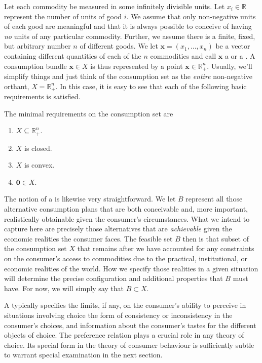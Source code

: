 \documentclass[b5paper]{memoir}
\begin{document}
Let each commodity be measured in some infinitely divisible units. Let $x_i \in \mathbb{R}$
represent the number of units of good $i$. We assume that only non-negative units of each
good are meaningful and that it is always possible to conceive of having \emph{no} units
of any particular commodity. Further, we assume there is a finite, fixed, but arbitrary
number $n$ of different goods. We let $\mathbf x = (x_1, \ldots, x_n )$ be a vector
containing different quantities of each of the $n$ commodities and call $\mathbf x$ a
 or a . A consumption bundle
$\mathbf x \in X$ is thus represented by a point $\mathbf x \in \mathbb{R}^n_+$. Usually,
we’ll simplify things and just think of the consumption set as the \emph{entire}
non-negative orthant, $X = \mathbb{R}^n_+$. In this case, it is easy to see that each 
of the following basic requirements is satisfied.

\begin{assump}
The minimal requirements on the consumption set are
\begin{enumerate} 
\item $X \subseteq \mathbb{R}^n_+$.
\item $X$ is closed.
\item $X$ is convex.
\item $\mathbf 0 \in X$.
\end{enumerate}
\end{assump}

The notion of a  is likewise very straightforward. We let $B$ represent
all those alternative consumption plans that are both conceivable and, more important,
realistically obtainable given the consumer’s circumstances. What we intend to capture
here are precisely those alternatives that are \emph{achievable} given the economic
realities the consumer faces. The feasible set $B$ then is that subset of the consumption
set $X$ that remains after we have accounted for any constraints on the consumer’s access
to commodities due to the practical, institutional, or economic realities of the world.
How we specify those realities in a given situation will determine the precise
configuration and additional properties that $B$ must have. 
For now, we will simply say that $B \subset X$.

A  typically specifies the limits, if any, on the consumer’s
ability to perceive in situations involving choice the form of consistency or
inconsistency in the consumer’s choices, and information about the consumer’s tastes for
the different objects of choice. The preference relation plays a crucial role in any
theory of choice. Its special form in the theory of consumer behaviour is sufficiently
subtle to warrant special examination in the next section.
\end{document}
